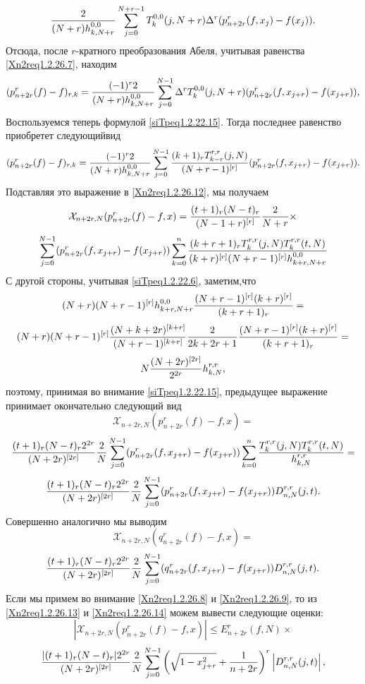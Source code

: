 $$ {2\over (N+r)h_{k,N+r}^{0,0}}
\sum_{j=0}^{N+r-1}T_k^{0,0}(j,N+r)\Delta^r(p_{n+2r}^r(f,x_j)-f(x_j)).
$$
 Отсюда, после $r$-кратного преобразования Абеля, учитывая равенства \eqref{Xn2req1.2.26.7},  находим
 $$
 (p_{n+2r}^r(f)-f)_{r,k}=
{(-1)^r2\over (N+r)h_{k,N+r}^{0,0}}
\sum_{j=0}^{N-1}\Delta^rT_k^{0,0}(j,N+r)(p_{n+2r}^r(f,x_{j+r})-f(x_{j+r})),
$$
 Воспользуемся  теперь формулой \eqref{siTpeq1.2.22.15}. Тогда последнее  равенство приобретет следующий\linebreak вид
$$
(p_{n+2r}^r(f)-f)_{r,k}= {(-1)^r2\over (N+r)h_{k,N+r}^{0,0}}
\sum_{j=0}^{N-1}{(k+1)_rT_{k-r}^{r,r}(j,N)\over (N+r-1)^{[r]}}
(p_{n+2r}^r(f,x_{j+r})-f(x_{j+r})).
 $$
 Подставляя это выражение в \eqref{Xn2req1.2.26.12}, мы получаем
  $$
  \mathcal{X}_{n+2r,N}(p_{n+2r}^r(f)-f,x)= {
(t+1)_r(N-t)_r\over (N-1+r)^{[r]}}{2\over N+r}\times
$$
$$
\sum_{j=0}^{N-1}(p_{n+2r}^r(f,x_{j+r})-f(x_{j+r}))\sum_{k=0}^n
{(k+r+1)_rT_k^{r,r}(j,N)T_k^{r,r}(t,N)\over
(k+r)^{[r]}(N+r-1)^{[r]}h_{k+r,N+r}^{0,0}}
$$
С другой стороны, учитывая \eqref{siTpeq1.2.22.6}, заметим,что
$$
(N+r)(N+r-1)^{[r]}h_{k+r,N+r}^{0,0}{(N+r-1)^{[r]}(k+r)^{[r]}\over(k+r+1)_r}=
$$
$$
(N+r)(N+r-1)^{[r]}{(N+k+2r)^{[k+r]}\over
(N+r-1)^{[k+r]}}{2\over 2k+2r+1}{(N+r-1)^{[r]}(k+r)^{[r]}\over(k+r+1)_r}=
$$
$$
N{(N+2r)^{[2r]}\over2^{2r}}h_{k,N}^{r,r},
$$
поэтому, принимая во внимание \eqref{siTpeq1.2.22.15}, предыдущее выражение принимает
окончательно следующий вид
$$
\mathcal{X}_{n+2r,N}(p_{n+2r}^r(f)-f,x)=
$$
$$ { (t+1)_r(N-t)_r2^{2r}\over (N+2r)^{[2r]}}{2\over
N} \sum_{j=0}^{N-1}(p_{n+2r}^r(f,x_{j+r})-f(x_{j+r}))\sum_{k=0}^n
{T_k^{r,r}(j,N)T_k^{r,r}(t,N)\over h_{k,N}^{r,r}}=
$$
 \begin{equation}\label{Xn2req1.2.26.13}
 {(t+1)_r(N-t)_r2^{2r}\over (N+2r)^{[2r]}}{2\over N}
\sum_{j=0}^{N-1}(p_{n+2r}^r(f,x_{j+r})-f(x_{j+r}))D_{n,N}^{r,r}(j,t).
\end{equation}
 Совершенно аналогично мы выводим
 $$
 \mathcal{X}_{n+2r,N}(q_{n+2r}^r(f)-f,x)=
 $$
 \begin{equation}\label{Xn2req1.2.26.14}
 {(t+1)_r(N-t)_r2^{2r}\over(N+2r)^{[2r]}}{2\over N}
\sum_{j=0}^{N-1}(q_{n+2r}^r(f,x_{j+r})-f(x_{j+r}))D_{n,N}^{r,r}(j,t).
\end{equation}
 Если мы примем во внимание \eqref{Xn2req1.2.26.8} и \eqref{Xn2req1.2.26.9}, то из \eqref{Xn2req1.2.26.13} и \eqref{Xn2req1.2.26.14} можем вывести следующие оценки:
 $$
 |\mathcal{X}_{n+2r,N}(p_{n+2r}^r(f)-f,x)|\le
E_{n+2r}^r(f,N)\times
$$
\begin{equation}\label{Xn2req1.2.26.15}
 {|(t+1)_r(N-t)_r|2^{2r}\over(N+2r)^{[2r]}}{2\over N}
\sum_{j=0}^{N-1}\left(\sqrt{1-x_{j+r}^2}+{1\over
n+2r}\right)^r\left|D_{n,N}^{r,r}(j,t)\right|,
\end{equation}
